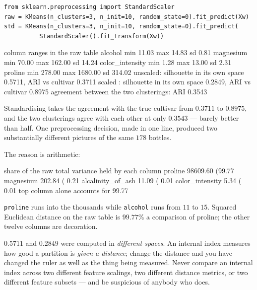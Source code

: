 \documentclass[11pt]{article}
\begin{document}
\begin{lstlisting}
from sklearn.preprocessing import StandardScaler
raw = KMeans(n_clusters=3, n_init=10, random_state=0).fit_predict(Xw)
std = KMeans(n_clusters=3, n_init=10, random_state=0).fit_predict(
          StandardScaler().fit_transform(Xw))
\end{lstlisting}
\begin{codeout}
column ranges in the raw table
   alcohol                  min    11.03  max    14.83  sd     0.81
   magnesium                min    70.00  max   162.00  sd    14.24
   color_intensity          min     1.28  max    13.00  sd     2.31
   proline                  min   278.00  max  1680.00  sd   314.02
unscaled: silhouette in its own space 0.5711, ARI vs cultivar 0.3711
scaled  : silhouette in its own space 0.2849, ARI vs cultivar 0.8975
agreement between the two clusterings: ARI 0.3543
\end{codeout}

Standardising takes the agreement with the true cultivar from
$\mathbf{0.3711}$ to $\mathbf{0.8975}$, and the two clusterings agree with
each other at only $0.3543$ --- barely better than half. One preprocessing
decision, made in one line, produced two substantially different pictures of
the same $178$ bottles.

The reason is arithmetic:

\begin{codeout}
share of the raw total variance held by each column
   proline                    98609.60  (99.77%
   magnesium                    202.84  ( 0.21%
   alcalinity_of_ash             11.09  ( 0.01%
   color_intensity                5.34  ( 0.01%
   top column alone accounts for 99.77%
\end{codeout}

\texttt{proline} runs into the thousands while \texttt{alcohol} runs from $11$
to $15$. Squared Euclidean distance on the raw table is
$\mathbf{99.77\%}$ a comparison of proline; the other twelve columns are
decoration.

\begin{caution}
$0.5711$ and $0.2849$ were computed in \emph{different spaces}. An internal
index measures how good a partition is \emph{given a distance}; change the
distance and you have changed the ruler as well as the thing being measured.
Never compare an internal index across two different feature scalings, two
different distance metrics, or two different feature subsets --- and be
suspicious of anybody who does.
\end{caution}
\end{document}
